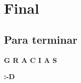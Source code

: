 %
%

\section{Final}

\subsection{Para terminar}
\begin{frame}
        \begin{center}
            \textbf{G R A C I A S}\par
            \textbf{:-D}\par
        \end{center}
\end{frame}